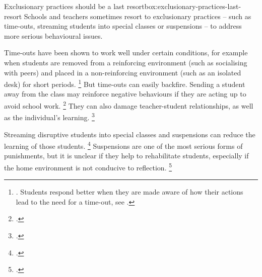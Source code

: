 \documentclass{grattan}
\begin{document}
 \begin{smallbox}{Exclusionary practices should be a last resort}{box:exclusionary-practices-last-resort}
Schools and teachers sometimes resort to exclusionary practices -- such as time-outs, streaming students into special classes or suspensions -- to address more serious behavioural issues.

Time-outs have been shown to work well under certain conditions, for example when students are removed from a reinforcing environment (such as socialising with peers) and placed in a non-reinforcing environment (such as an isolated desk) for short periods.%
    \footnote{\textcites[][365--6]{Sullivan2014PunishThemEngage}[][141]{TurnerWatson1999ConsultantsGuideTimeOut}. Students respond better when they are made aware of how their actions lead to the need for a time-out, see \textcite[][139]{TurnerWatson1999ConsultantsGuideTimeOut}.}
But time-outs can easily backfire. Sending a student away from the class may reinforce negative behaviours if they are acting up to avoid school work.%
    \footcites{InterventionCentralNDTimeOutReinforcement}{TurnerWatson1999ConsultantsGuideTimeOut}
They can also damage teacher-student relationships, as well as the individual's learning.%
    \footcites{InterventionCentralNDTimeOutReinforcement}{TurnerWatson1999ConsultantsGuideTimeOut}{Wilhoit2000GuidelinesEffectiveUse}

Streaming disruptive students into special classes and suspensions can reduce the learning of those students.%
    \footcites{Graham2016CaughtBetweenRock}{Muller2010NegativePeerInfluence}{Skiba2008SafteyWithoutSuspensions}
Suspensions are one of the most serious forms of punishments, but it is unclear if they help to rehabilitate students, especially if the home environment is not conducive to reflection.%
    \footcites{Kohistani2015SchoolSuspensionBeneficial}{Osher2010HowCanWeImprove}
\end{smallbox}
\end{document}
